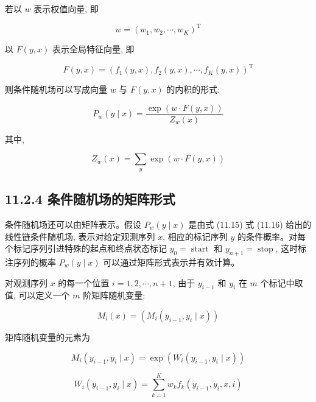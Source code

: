 \documentclass[10pt]{article}
\begin{document}
\begin{CJK*}{UTF8}{bsmi}
若以 $w$ 表示权值向量, 即


\begin{equation*}
w=\left(w_{1}, w_{2}, \cdots, w_{K}\right)^{\mathrm{T}} \tag{11.17}
\end{equation*}


以 $F(y, x)$ 表示全局特征向量, 即


\begin{equation*}
F(y, x)=\left(f_{1}(y, x), f_{2}(y, x), \cdots, f_{K}(y, x)\right)^{\mathrm{T}} \tag{11.18}
\end{equation*}


则条件随机场可以写成向量 $w$ 与 $F(y, x)$ 的内积的形式:


\begin{equation*}
P_{w}(y \mid x)=\frac{\exp (w \cdot F(y, x))}{Z_{w}(x)} \tag{11.19}
\end{equation*}


其中,


\begin{equation*}
Z_{w}(x)=\sum_{y} \exp (w \cdot F(y, x)) \tag{11.20}
\end{equation*}


\subsection*{11.2.4 条件随机场的矩阵形式}
条件随机场还可以由矩阵表示。假设 $P_{w}(y \mid x)$ 是由式 (11.15) 式 (11.16) 给出的线性链条件随机场, 表示对给定观测序列 $x$, 相应的标记序列 $y$ 的条件概率。对每个标记序列引进特殊的起点和终点状态标记 $y_{0}=\operatorname{start}$ 和 $y_{n+1}=\operatorname{stop}$, 这时标注序列的概率 $P_{w}(y \mid x)$ 可以通过矩阵形式表示并有效计算。

对观测序列 $x$ 的每一个位置 $i=1,2, \cdots, n+1$, 由于 $y_{i-1}$ 和 $y_{i}$ 在 $m$ 个标记中取值, 可以定义一个 $m$ 阶矩阵随机变量:


\begin{equation*}
M_{i}(x)=\left(M_{i}\left(y_{i-1}, y_{i} \mid x\right)\right) \tag{11.21}
\end{equation*}


矩阵随机变量的元素为


\begin{equation*}
M_{i}\left(y_{i-1}, y_{i} \mid x\right)=\exp \left(W_{i}\left(y_{i-1}, y_{i} \mid x\right)\right) \tag{11.22}
\end{equation*}



\begin{equation*}
W_{i}\left(y_{i-1}, y_{i} \mid x\right)=\sum_{k=1}^{K} w_{k} f_{k}\left(y_{i-1}, y_{i}, x, i\right) \tag{11.23}
\end{equation*}



\end{CJK*}
\end{document}
